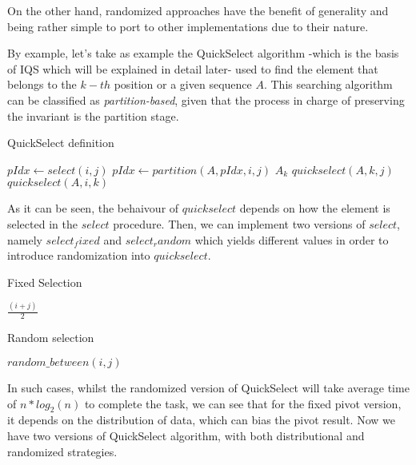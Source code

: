 \documentclass{iccmemoria}
\begin{document}
On the other hand, randomized approaches have the benefit of generality and being rather simple to port to other implementations due to their nature.

By example, let's take as example the QuickSelect algorithm -which is the basis of IQS which will be explained in detail later- used to find the element that belongs to the $k-th$ position or a given sequence $A$. This searching algorithm can be classified as \textit{partition-based}, given that the process in charge of preserving the invariant is the partition stage.


\begin{algorithm}
  \caption{QuickSelect definition}\label{ALG:QuickSelect}
  \begin{algorithmic}[1]
    \State $pIdx \gets select(i,j)$
    \State $pIdx \gets partition(A,pIdx,i,j)$
     \Return $A_k$
    \EndIf
     \Return $quickselect(A, k, j)$
    \EndIf
     \Return $quickselect(A, i, k)$
    \EndIf
    \EndProcedure
  \end{algorithmic}
\end{algorithm}

As it can be seen, the behaivour of $quickselect$ depends on how the element is selected in the $select$ procedure. Then, we can implement two versions of $select$, namely $select_fixed$ and $select_random$ which yields different values in order to introduce randomization into $quickselect$.

\begin{algorithm}
  \caption{Fixed Selection}\label{ALG:Select_fixed}
  \begin{algorithmic}[1]
    \State \Return $\frac{(i+j)}{2}$
    \EndProcedure
  \end{algorithmic}
\end{algorithm}

\begin{algorithm}
  \caption{Random selection}\label{ALG:Select_random}
  \begin{algorithmic}[1]
    \State \Return $random\_between(i,j)$
    \EndProcedure
  \end{algorithmic}
\end{algorithm}

In such cases, whilst the randomized version of QuickSelect will take average time of $n*log_2(n)$ to complete the task, we can see that for the fixed pivot version, it depends on the distribution of data, which can bias the pivot result. Now we have two versions of QuickSelect algorithm, with both distributional and randomized strategies.
\end{document}
